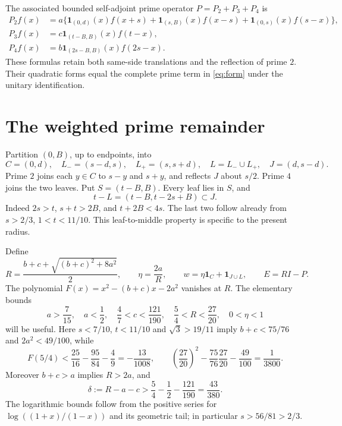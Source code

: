 \documentclass[11pt]{article}
\newcommand{\ind}{\mathbf1}
\begin{document}
The associated bounded self-adjoint prime operator $P=P_2+P_3+P_4$ is
\begin{align}
 P_2f(x)&=a\{\ind_{(0,d)}(x)f(x+s)+\ind_{(s,B)}(x)f(x-s)
                  +\ind_{(0,s)}(x)f(s-x)\},\label{eq:prime}\\
 P_3f(x)&=c\ind_{(t-B,B)}(x)f(t-x),\nonumber\\
 P_4f(x)&=b\ind_{(2s-B,B)}(x)f(2s-x).\nonumber
\end{align}
These formulas retain both same-side translations and the reflection of prime $2$. Their quadratic forms equal the complete prime term in \eqref{eq:form} under the unitary identification.

\section{The weighted prime remainder}
Partition $(0,B)$, up to endpoints, into
\[
 C=(0,d),\quad L_-=(s-d,s),\quad L_+=(s,s+d),\quad
 L=L_-\cup L_+,\quad J=(d,s-d).
\]
Prime $2$ joins each $y\in C$ to $s-y$ and $s+y$, and reflects $J$ about $s/2$. Prime $4$ joins the two leaves. Put $S=(t-B,B)$. Every leaf lies in $S$, and
\begin{equation}
 t-L=(t-B,t-2s+B)\subset J.\label{eq:geometry}
\end{equation}
Indeed $2s>t$, $s+t>2B$, and $t+2B<4s$. The last two follow already from $s>2/3$, $1<t<11/10$. This leaf-to-middle property is specific to the present radius.

Define
\begin{equation}
 R=\frac{b+c+\sqrt{(b+c)^2+8a^2}}2,\qquad
 \eta=\frac{2a}{R},\qquad w=\eta\ind_C+\ind_{J\cup L},\qquad E=RI-P.
 \label{eq:weight}
\end{equation}
The polynomial $F(x)=x^2-(b+c)x-2a^2$ vanishes at $R$. The elementary bounds
\begin{equation}
 a>\frac7{15},\quad a<\frac12,\quad
 \frac47<c<\frac{121}{190},\quad \frac54<R<\frac{27}{20},\quad 0<\eta<1
 \label{eq:rational}
\end{equation}
will be useful. Here $s<7/10$, $t<11/10$ and $\sqrt3>19/11$ imply $b+c<75/76$ and $2a^2<49/100$, while
\[
 F(5/4)<\frac{25}{16}-\frac{95}{84}-\frac49=-\frac{13}{1008},
 \qquad
 \left(\frac{27}{20}\right)^2-\frac{75}{76}\frac{27}{20}-\frac{49}{100}
 =\frac1{3800}.
\]
Moreover $b+c>a$ implies $R>2a$, and
\begin{equation}
 \delta:=R-a-c>\frac54-\frac12-\frac{121}{190}=\frac{43}{380}.
 \label{eq:delta}
\end{equation}
The logarithmic bounds follow from the positive series for $\log((1+x)/(1-x))$ and its geometric tail; in particular $s>56/81>2/3$.
\end{document}
